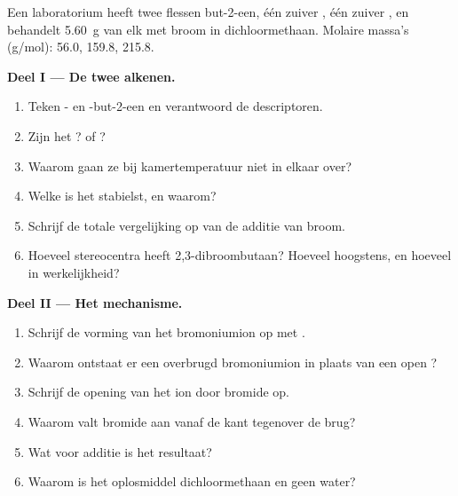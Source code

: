 \begin{problem}
\label{pb:b1:electrophilic-additions:1}
Een laboratorium heeft twee flessen but-2-een, één zuiver , één
zuiver , en behandelt \qty{5.60}{g} van elk met broom in
dichloormethaan. Molaire massa's (\unit{g/mol}):  56.0,
 159.8,  215.8.

\medskip
\noindent\textbf{Deel I --- De twee alkenen.}
\begin{enumerate}
  \item Teken - en -but-2-een en verantwoord de
        descriptoren.
  \item Zijn het ?  of ?
  \item Waarom gaan ze bij kamertemperatuur niet in elkaar over?
  \item Welke is het stabielst, en waarom?
  \item Schrijf de totale vergelijking op van de additie van broom.
  \item Hoeveel stereocentra heeft 2,3-dibroombutaan? Hoeveel
         hoogstens, en hoeveel in werkelijkheid?
\end{enumerate}

\medskip
\noindent\textbf{Deel II --- Het mechanisme.}
\begin{enumerate}[resume]
  \item Schrijf de vorming van het bromoniumion op met .
  \item Waarom ontstaat er een overbrugd bromoniumion in plaats van een
        open ?
  \item Schrijf de opening van het ion door bromide op.
  \item Waarom valt bromide aan vanaf de kant tegenover de brug?
  \item Wat voor additie is het resultaat?
  \item Waarom is het oplosmiddel dichloormethaan en geen water?
\end{enumerate}


\end{problem}
